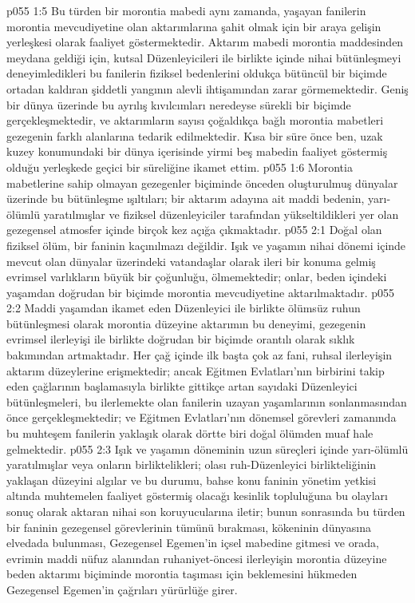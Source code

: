 \vs p055 1:5 Bu türden bir morontia mabedi aynı zamanda, yaşayan fanilerin morontia mevcudiyetine olan aktarımlarına şahit olmak için bir araya gelişin yerleşkesi olarak faaliyet göstermektedir. Aktarım mabedi morontia maddesinden meydana geldiği için, kutsal Düzenleyicileri ile birlikte içinde nihai bütünleşmeyi deneyimledikleri bu fanilerin fiziksel bedenlerini oldukça bütüncül bir biçimde ortadan kaldıran şiddetli yangının alevli ihtişamından zarar görmemektedir. Geniş bir dünya üzerinde bu ayrılış kıvılcımları neredeyse sürekli bir biçimde gerçekleşmektedir, ve aktarımların sayısı çoğaldıkça bağlı morontia mabetleri gezegenin farklı alanlarına tedarik edilmektedir. Kısa bir süre önce ben, uzak kuzey konumundaki bir dünya içerisinde yirmi beş mabedin faaliyet göstermiş olduğu yerleşkede geçici bir süreliğine ikamet ettim.
\vs p055 1:6 Morontia mabetlerine sahip olmayan gezegenler biçiminde önceden oluşturulmuş dünyalar üzerinde bu bütünleşme ışıltıları; bir aktarım adayına ait maddi bedenin, yarı\hyp{}ölümlü yaratılmışlar ve fiziksel düzenleyiciler tarafından yükseltildikleri yer olan gezegensel atmosfer içinde birçok kez açığa çıkmaktadır.
\vs p055 2:1 Doğal olan fiziksel ölüm, bir faninin kaçınılmazı değildir. Işık ve yaşamın nihai dönemi içinde mevcut olan dünyalar üzerindeki vatandaşlar olarak ileri bir konuma gelmiş evrimsel varlıkların büyük bir çoğunluğu, ölmemektedir; onlar, beden içindeki yaşamdan doğrudan bir biçimde morontia mevcudiyetine aktarılmaktadır.
\vs p055 2:2 Maddi yaşamdan ikamet eden Düzenleyici ile birlikte ölümsüz ruhun bütünleşmesi olarak morontia düzeyine aktarımın bu deneyimi, gezegenin evrimsel ilerleyişi ile birlikte doğrudan bir biçimde orantılı olarak sıklık bakımından artmaktadır. Her çağ içinde ilk başta çok az fani, ruhsal ilerleyişin aktarım düzeylerine erişmektedir; ancak Eğitmen Evlatları’nın birbirini takip eden çağlarının başlamasıyla birlikte gittikçe artan sayıdaki Düzenleyici bütünleşmeleri, bu ilerlemekte olan fanilerin uzayan yaşamlarının sonlanmasından önce gerçekleşmektedir; ve Eğitmen Evlatları’nın dönemsel görevleri zamanında bu muhteşem fanilerin yaklaşık olarak dörtte biri doğal ölümden muaf hale gelmektedir.
\vs p055 2:3 Işık ve yaşamın döneminin uzun süreçleri içinde yarı\hyp{}ölümlü yaratılmışlar veya onların birliktelikleri; olası ruh\hyp{}Düzenleyici birlikteliğinin yaklaşan düzeyini algılar ve bu durumu, bahse konu faninin yönetim yetkisi altında muhtemelen faaliyet göstermiş olacağı kesinlik topluluğuna bu olayları sonuç olarak aktaran nihai son koruyucularına iletir; bunun sonrasında bu türden bir faninin gezegensel görevlerinin tümünü bırakması, kökeninin dünyasına elvedada bulunması, Gezegensel Egemen’in içsel mabedine gitmesi ve orada, evrimin maddi nüfuz alanından ruhaniyet\hyp{}öncesi ilerleyişin morontia düzeyine beden aktarımı biçiminde morontia taşıması için beklemesini hükmeden Gezegensel Egemen’in çağrıları yürürlüğe girer.
